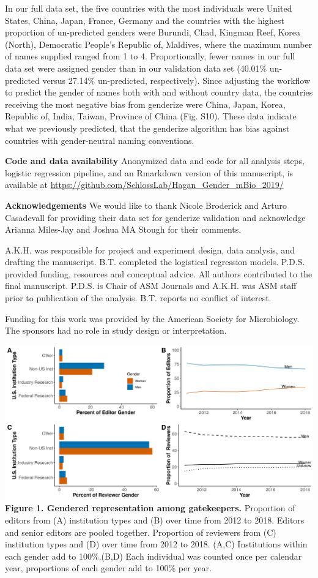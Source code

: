 \documentclass[11pt,]{article}
\begin{document}
In our full data set, the five countries with the most individuals were
United States, China, Japan, France, Germany and the countries with the
highest proportion of un-predicted genders were Burundi, Chad, Kingman
Reef, Korea (North), Democratic People's Republic of, Maldives, where
the maximum number of names supplied ranged from 1 to 4. Proportionally,
fewer names in our full data set were assigned gender than in our
validation data set (40.01\% un-predicted versus 27.14\% un-predicted,
respectively). Since adjusting the workflow to predict the gender of
names both with and without country data, the countries receiving the
most negative bias from genderize were China, Japan, Korea, Republic of,
India, Taiwan, Province of China (Fig. S10). These data indicate what we
previously predicted, that the genderize algorithm has bias against
countries with gender-neutral naming conventions.

\textbf{Code and data availability} Anonymized data and code for all
analysis steps, logistic regression pipeline, and an Rmarkdown version
of this manuscript, is available at
\url{https://github.com/SchlossLab/Hagan_Gender_mBio_2019/}

\textbf{Acknowledgements} We would like to thank Nicole Broderick and
Arturo Casadevall for providing their data set for genderize validation
and acknowledge Arianna Miles-Jay and Joshua MA Stough for their
comments.

A.K.H. was responsible for project and experiment design, data analysis,
and drafting the manuscript. B.T. completed the logistical regression
models. P.D.S. provided funding, resources and conceptual advice. All
authors contributed to the final manuscript. P.D.S. is Chair of ASM
Journals and A.K.H. was ASM staff prior to publication of the analysis.
B.T. reports no conflict of interest.

Funding for this work was provided by the American Society for
Microbiology. The sponsors had no role in study design or
interpretation.

\newpage

\includegraphics{Figure_1.png} \textbf{Figure 1. Gendered representation
among gatekeepers.} Proportion of editors from (A) institution types and
(B) over time from 2012 to 2018. Editors and senior editors are pooled
together. Proportion of reviewers from (C) institution types and (D)
over time from 2012 to 2018. (A,C) Institutions within each gender add
to 100\%.(B,D) Each individual was counted once per calendar year,
proportions of each gender add to 100\% per year.
\end{document}
